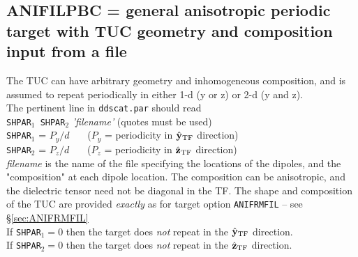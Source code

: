 \subsection{ ANIFILPBC = general anisotropic periodic target with TUC 
            geometry and composition input from a file
            \label{sec:ANIFILPBC} }
        The TUC can have arbitrary geometry and inhomogeneous
        composition, and is assumed to repeat periodically in either 
        1-d (y or z) or 2-d (y and z).\\
        The pertinent line in {\tt ddscat.par} should read\\
        {\tt SHPAR$_1$ SHPAR$_2$} {\it 'filename'} (quotes must be used)\\
        {\tt SHPAR}$_1$ = $P_y/d$~~~ 
            ($P_y$ = periodicity in $\hat{\bf y}_{\rm TF}$ direction)\\
        {\tt SHPAR}$_2$ = $P_z/d$~~~
            ($P_z$ = periodicity in $\hat{\bf z}_{\rm TF}$ direction)\\
        {\it filename} is the name of the file specifying the locations
        of the dipoles, and the "composition" at each dipole location.  The
        composition can be anisotropic, and the dielectric tensor need not
        be diagonal in the TF.  The shape and composition of the TUC
        are provided {\it exactly} as for target option {\tt ANIFRMFIL} --
        see \S\ref{sec:ANIFRMFIL}\\
        If {\tt SHPAR}$_1=0$ then the target does {\it not} repeat in the
            $\hat{\bf y}_{\rm TF}$ direction.\\
        If {\tt SHPAR}$_2=0$ then the target does {\it not} repeat in the
            $\hat{\bf z}_{\rm TF}$ direction.\\
